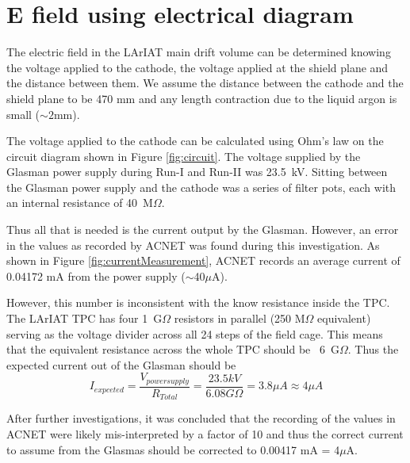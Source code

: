 \clearpage
\newpage
\section{E field using electrical diagram}\label{sec:elDiagram}
The electric field in the LArIAT main drift volume can be determined knowing the voltage applied to the cathode, the voltage applied at the shield plane and the distance between them. We assume the distance between the cathode and the shield plane to be 470 mm and any length contraction due to the liquid argon is small ($\sim 2$mm).

The voltage applied to the cathode can be calculated using Ohm's law on the circuit diagram shown in Figure \ref{fig:circuit}. The voltage supplied by the Glasman power supply during Run-I and Run-II was 23.5~kV. Sitting between the Glasman power supply and the cathode was a series of filter pots, each with an internal resistance of 40~M$\Omega$. 

Thus all that is needed is the current output by the Glasman. However, an error in the values as recorded by ACNET was found during this investigation. As shown in Figure \ref{fig:currentMeasurement}, ACNET records an average current of 0.04172 mA from the power supply ($\sim$40$\mu$A). 

However, this number is inconsistent with the know resistance inside the TPC. The LArIAT TPC has four 1~G$\Omega$ resistors in parallel (250 M$\Omega$ equivalent) serving as the voltage divider across all 24 steps of the field cage. This means that the equivalent resistance across the whole TPC should be ~6~G$\Omega$. Thus the expected current out of the Glasman should be 
\begin{equation}
I_{expceted} = \frac{V_{power supply}}{R_{Total}} = \frac{23.5 kV}{6.08 G\Omega} = 3.8 \mu A \approx 4 \mu A
\end{equation}

After further investigations, it was concluded that the recording of the values in ACNET were likely mis-interpreted by a factor of 10 and thus the correct current to assume from the Glasmas should be corrected to 0.00417 mA = 4$\mu$A.

